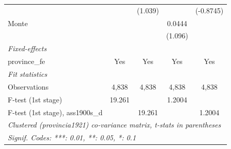 \begin{table}[htbp]
\begin{tabular}{lcccc}
$$                                       &                        & (1.039)                       &                        & (-0.8745)\\   
      Monte                            &                        &                               & 0.0444                 &   \\   
                                       &                        &                               & (1.096)                &   \\   
      \midrule
      \emph{Fixed-effects}\\
      province\_fe                     & Yes                    & Yes                           & Yes                    & Yes\\  
      \midrule
      \emph{Fit statistics}\\
      Observations                     & 4,838                  & 4,838                         & 4,838                  & 4,838\\  
      F-test (1st stage)               & 19.261                 &                               & 1.2004                 & \\  
      F-test (1st stage), ass1900s\_d  &                        & 19.261                        &                        & 1.2004\\  
      \midrule \midrule
      \multicolumn{5}{l}{\emph{Clustered (provincia1921) co-variance matrix, t-stats in parentheses}}\\
      \multicolumn{5}{l}{\emph{Signif. Codes: ***: 0.01, **: 0.05, *: 0.1}}\\
   \end{tabular}
\end{table}


